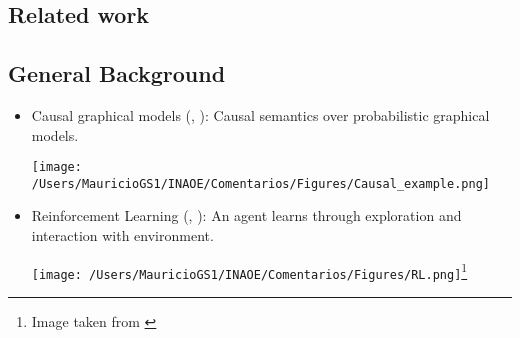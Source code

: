 \documentclass[a0,portrait]{a0poster}
\begin{document}
\begin{multicols}{3}
\color{DarkSlateGray} %

\section*{Related work}
\subsection*{General Background}
\begin{itemize}
\item Causal graphical models (\cite{pearl2009causality}, \cite{koller2009probabilistic}): Causal semantics over probabilistic graphical models.
\begin{center}
\texttt{[image: /Users/MauricioGS1/INAOE/Comentarios/Figures/Causal\_example.png]}
\end{center}
\item Reinforcement Learning (\cite{sutton1998reinforcement}, \cite{gershman2015reinforcement}): An agent learns through exploration and interaction with environment.
\begin{center}
\texttt{[image: /Users/MauricioGS1/INAOE/Comentarios/Figures/RL.png]}\footnote{Image taken from \cite{sutton1998reinforcement}}
\end{center}
\end{itemize}

\end{multicols}
\end{document}
